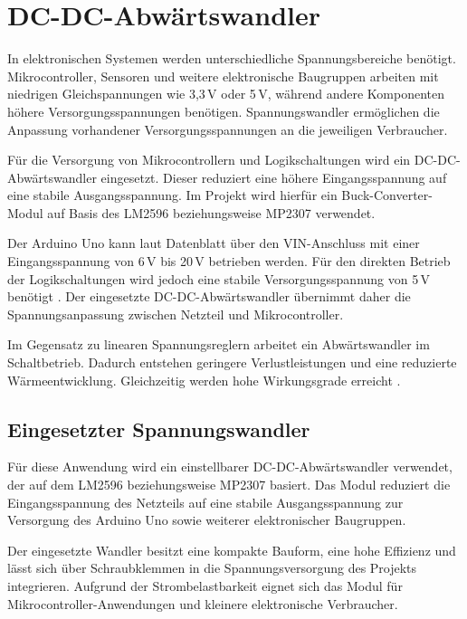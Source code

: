 %
%

\chapter{DC-DC-Abwärtswandler}

In elektronischen Systemen werden unterschiedliche Spannungsbereiche benötigt. 
Mikrocontroller, Sensoren und weitere elektronische Baugruppen arbeiten mit niedrigen Gleichspannungen wie 3,3\,V oder 5\,V, während andere Komponenten höhere Versorgungsspannungen benötigen. 
Spannungswandler ermöglichen die Anpassung vorhandener Versorgungsspannungen an die jeweiligen Verbraucher.

Für die Versorgung von Mikrocontrollern und Logikschaltungen wird ein DC-DC-Abwärtswandler eingesetzt. 
Dieser reduziert eine höhere Eingangsspannung auf eine stabile Ausgangsspannung. 
Im Projekt wird hierfür ein Buck-Converter-Modul auf Basis des LM2596 beziehungsweise MP2307 verwendet.

Der Arduino Uno kann laut Datenblatt über den VIN-Anschluss mit einer Eingangsspannung von 6\,V bis 20\,V betrieben werden. 
Für den direkten Betrieb der Logikschaltungen wird jedoch eine stabile Versorgungsspannung von 5\,V benötigt \cite{arduino:uno-datasheet}. 
Der eingesetzte DC-DC-Abwärtswandler übernimmt daher die Spannungsanpassung zwischen Netzteil und Mikrocontroller.

Im Gegensatz zu linearen Spannungsreglern arbeitet ein Abwärtswandler im Schaltbetrieb. 
Dadurch entstehen geringere Verlustleistungen und eine reduzierte Wärmeentwicklung. 
Gleichzeitig werden hohe Wirkungsgrade erreicht \cite{Schlienz:2020}.

\section{Eingesetzter Spannungswandler}

Für diese Anwendung wird ein einstellbarer DC-DC-Abwärtswandler verwendet, der auf dem LM2596 beziehungsweise MP2307 basiert. 
Das Modul reduziert die Eingangsspannung des Netzteils auf eine stabile Ausgangsspannung zur Versorgung des Arduino Uno sowie weiterer elektronischer Baugruppen.

Der eingesetzte Wandler besitzt eine kompakte Bauform, eine hohe Effizienz und lässt sich über Schraubklemmen in die Spannungsversorgung des Projekts integrieren. 
Aufgrund der Strombelastbarkeit eignet sich das Modul für Mikrocontroller-Anwendungen und kleinere elektronische Verbraucher.

